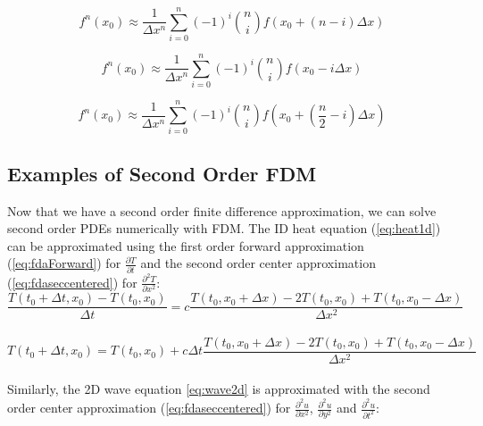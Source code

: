 {  \begin{equation}\label{eq:generalFDAForward}
 f^{n}(x_{0}) \approx \frac{1}{\Delta  x^{n}}\sum_{i=0}^{n}(-1)^{i}\binom {n} {i}f(x_{0} + (n-i)\Delta  x)
 \end{equation}
 
 \begin{equation}\label{eq:generalFDABackward}
 f^{n}(x_{0}) \approx \frac{1}{\Delta  x^{n}}\sum_{i=0}^{n}(-1)^{i}\binom {n} {i}f(x_{0} - i\Delta  x)
 \end{equation}
 
  \begin{equation}\label{eq:generalFDACenter}
 f^{n}(x_{0}) \approx \frac{1}{\Delta  x^{n}}\sum_{i=0}^{n}(-1)^{i}\binom {n} {i}f(x_{0} + \left(\frac{n}{2}-i\right)\Delta  x)
 \end{equation}
 
\subsection{Examples of Second Order FDM}\label{sec:secondOrderExamples}

Now that we have a second order finite difference approximation, we can solve second order PDEs numerically with FDM.  The ID heat equation (\ref{eq:heat1d}) can be approximated using the first order forward approximation (\ref{eq:fdaForward}) for $\frac{\partial T}{\partial t}$ and the second order center approximation (\ref{eq:fdaseccentered}) for $\frac{\partial^{2} T}{\partial x^{2}}$:\\

 \begin{equation}
  \frac{T(t_{0} + \Delta  t, x_{0}) - T(t_{0}, x_{0})}{\Delta  t} = c\frac{T(t_{0},x_{0} + \Delta  x)- 2T(t_{0},x_{0}) + T(t_{0},x_{0} -\Delta  x)}{\Delta  x^{2}}
  \end{equation}
\\
 \begin{equation}\label{eq:heatfda1D}
  T(t_{0} + \Delta  t, x_{0}) = T(t_{0}, x_{0}) + c\Delta  t\frac{T(t_{0},x_{0} + \Delta  x) - 2T(t_{0},x_{0}) + T(t_{0},x_{0} -\Delta  x)}{\Delta  x^{2}}
  \end{equation}
\\
Similarly, the 2D wave equation \ref{eq:wave2d} is approximated with the second order center approximation (\ref{eq:fdaseccentered}) for $\frac{\partial^{2} u}{\partial x^{2}}$, $\frac{\partial^{2} u}{\partial y^{2}}$ and $\frac{\partial^{2} u}{\partial t^{2}}$:

}
